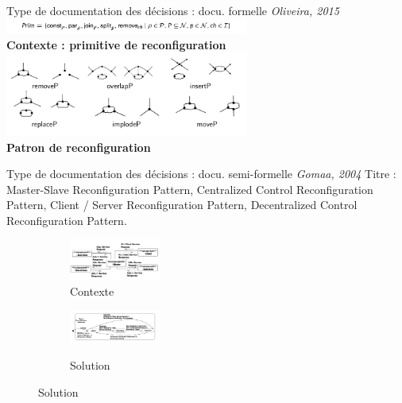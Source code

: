 \begin{frame}[fragile]{Type de documentation des décisions : docu. formelle
\emph{Oliveira, 2015}}
\centering
\includegraphics[width=8cm]{imgs/slide_oliveira_primitive.png}\\
\textbf{Contexte : primitive de reconfiguration}\\
\includegraphics[width=8cm]{imgs/slide_oliveira_patron.png}\\
\textbf{Patron de reconfiguration}
\begin{table}[]


\end{table}
\end{frame}

\begin{frame}[fragile]{Type de documentation des décisions : docu.
semi-formelle
\emph{Gomaa, 2004}}
Titre : Master-Slave Reconfiguration Pattern, Centralized Control
Reconfiguration Pattern, Client / Server Reconfiguration Pattern,
Decentralized Control Reconfiguration
Pattern.
\begin{figure}
\begin{subfigure}[b]{0.5\textwidth} %
\includegraphics[width=3cm]{imgs/gomaa_contexte}
\caption{Contexte}\label{fig:orchid}
\end{subfigure}
\begin{subfigure}[b]{0.5\textwidth} %
\includegraphics[width=3cm]{imgs/gomaa_solution}\\
\caption{Solution}\label{fig:orchid}
\end{subfigure}
\end{figure}
\end{frame}

